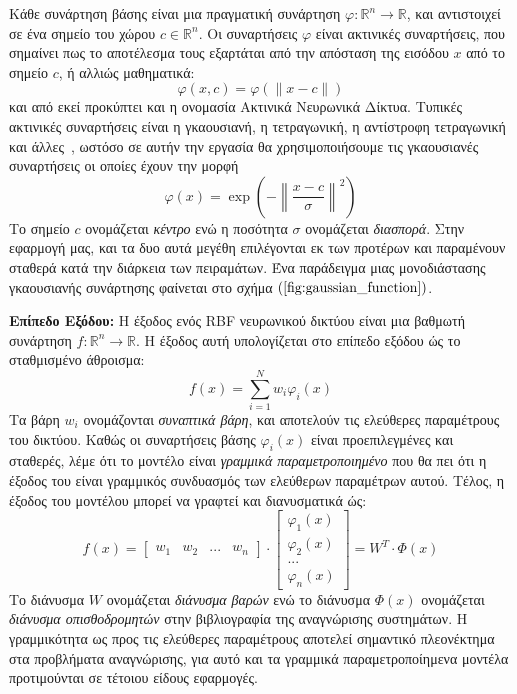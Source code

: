Κάθε συνάρτηση βάσης είναι μια πραγματική συνάρτηση $\varphi: \mathbb{R}^n \rightarrow \mathbb{R} $, και αντιστοιχεί σε ένα σημείο του χώρου $c \in \mathbb{R}^n$. Οι συναρτήσεις $\varphi$ είναι ακτινικές συναρτήσεις, που σημαίνει πως το αποτέλεσμα τους εξαρτάται από την απόσταση της εισόδου $x$ από το σημείο $c$, ή αλλιώς μαθηματικά:
\begin{equation*}
	\varphi(x,c) = \varphi(\| x - c \|)
\end{equation*}
και από εκεί προκύπτει και η ονομασία Ακτινικά Νευρωνικά Δίκτυα. Τυπικές ακτινικές συναρτήσεις είναι η γκαουσιανή, η τετραγωνική, η αντίστροφη τετραγωνική και άλλες~\cite{wiki:rbf}, ωστόσο σε αυτήν την εργασία θα χρησιμοποιήσουμε τις γκαουσιανές συναρτήσεις οι οποίες έχουν την μορφή
\begin{equation*}
	\varphi(x) = \exp \left( - \left\| \frac{x - c}{\sigma}\right\|^2 \right)
\end{equation*}
Το σημείο $c$ ονομάζεται \textit{κέντρο} ενώ η ποσότητα $\sigma$ ονομάζεται \textit{διασπορά}. Στην εφαρμογή μας, και τα δυο αυτά μεγέθη επιλέγονται εκ των προτέρων και παραμένουν σταθερά κατά την διάρκεια των πειραμάτων. Ένα παράδειγμα μιας μονοδιάστασης γκαουσιανής συνάρτησης φαίνεται στο σχήμα $(\ref{fig:gaussian_function})$.


\textbf{Επίπεδο Εξόδου:} Η έξοδος ενός RBF νευρωνικού δικτύου είναι μια βαθμωτή συνάρτηση $f: \mathbb{R}^n \rightarrow \mathbb{R} $. Η έξοδος αυτή υπολογίζεται στο επίπεδο εξόδου ώς το σταθμισμένο άθροισμα:
\begin{equation*}
	f(x) = \sum_{i = 1}^{N} w_i \varphi_i (x)
\end{equation*}
Τα βάρη $w_i$ ονομάζονται \textit{συναπτικά βάρη}, και αποτελούν τις ελεύθερες παραμέτρους του δικτύου. Καθώς οι συναρτήσεις βάσης $\varphi_i(x)$ είναι προεπιλεγμένες και σταθερές, λέμε ότι το μοντέλο είναι \textit{γραμμικά παραμετροποιημένο} που θα πει ότι η έξοδος του είναι γραμμικός συνδυασμός των ελεύθερων παραμέτρων αυτού. Τέλος, η έξοδος του μοντέλου μπορεί να γραφτεί και διανυσματικά ώς:
\begin{equation*}
	f(x) = \begin{bmatrix} w_1 & w_2 & ... & w_n \end{bmatrix} \cdot \begin{bmatrix}
	\varphi_1(x) \\ \varphi_2(x) \\ ... \\ \varphi_n(x)
	\end{bmatrix} = 
	W^T \cdot  \varPhi(x)
\end{equation*}
Το διάνυσμα $W$ ονομάζεται \textit{διάνυσμα βαρών} ενώ το διάνυσμα $\varPhi(x)$ ονομάζεται \textit{διάνυσμα οπισθοδρομητών} στην βιβλιογραφία της αναγνώρισης συστημάτων. Η γραμμικότητα ως προς τις ελεύθερες παραμέτρους αποτελεί σημαντικό πλεονέκτημα στα προβλήματα αναγνώρισης, για αυτό και τα γραμμικά παραμετροποίημενα μοντέλα προτιμούνται σε τέτοιου είδους εφαρμογές.


